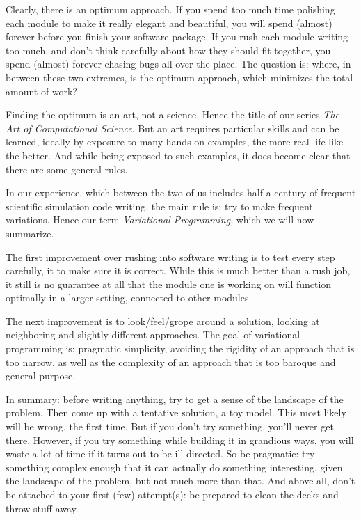 Clearly, there is an optimum approach.  If you spend too much time
polishing each module to make it really elegant and beautiful, you
will spend (almost) forever before you finish your software package.
If you rush each module writing too much, and don't think carefully
about how they should fit together, you spend (almost) forever chasing
bugs all over the place.  The question is: where, in between these two
extremes, is the optimum approach, which minimizes the total amount of
work?

Finding the optimum is an art, not a science.  Hence the title of our
series {\it The Art of Computational Science}.  But an art requires
particular skills and can be learned, ideally by exposure to many
hands-on examples, the more real-life-like the better.  And while
being exposed to such examples, it does become clear that there are
some general rules.

In our experience, which between the two of us includes half a century
of frequent scientific simulation code writing, the main rule is: try
to make frequent variations.  Hence our term {\it Variational Programming},
which we will now summarize.

The first improvement over rushing into software writing is to test
every step carefully, it to make sure it is correct.  While this is
much better than a rush job, it still is no guarantee at all that the
module one is working on will function optimally in a larger setting,
connected to other modules.

The next improvement is to look/feel/grope around a solution, looking
at neighboring and slightly different approaches.  The goal of
variational programming is: pragmatic simplicity, avoiding the
rigidity of an approach that is too narrow, as well as the complexity
of an approach that is too baroque and general-purpose.

In summary: before writing anything, try to get a sense of the
landscape of the problem.  Then come up with a tentative solution, a
toy model.  This most likely will be wrong, the first time.  But if
you don't try something, you'll never get there.  However, if you try
something while building it in grandious ways, you will waste a lot of
time if it turns out to be ill-directed.  So be pragmatic: try something
complex enough that it can actually do something interesting, given
the landscape of the problem, but not much more than that.  And above
all, don't be attached to your first (few) attempt(s): be prepared to
clean the decks and throw stuff away.

